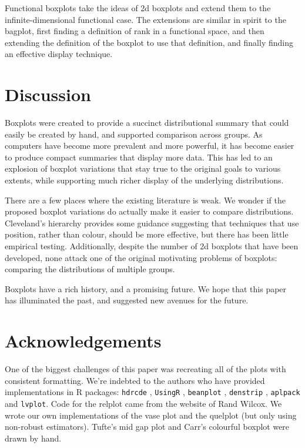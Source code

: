 \documentclass[oneside]{article}
\begin{document}
Functional boxplots \citep{hyndman:2010,sun:2011} take the ideas of 2d boxplots and extend them to the infinite-dimensional functional case. The extensions are similar in spirit to the bagplot, first finding a definition of rank in a functional space, and then extending the definition of the boxplot to use that definition, and finally finding an effective display technique.

\section{Discussion}
\label{sec:discussion}

Boxplots were created to provide a succinct distributional summary that could easily be created by hand, and supported comparison across groups. As computers have become more prevalent and more powerful, it has become easier  to produce compact summaries that display more data. This has led to an explosion of boxplot variations that stay true to the original goals to various extents, while supporting much richer display of the underlying distributions.

There are a few places where the existing literature is weak. We wonder if the proposed boxplot variations do actually make it easier to compare distributions. Cleveland's hierarchy \citep{cleveland:1984} provides some guidance suggesting that techniques that use position, rather than colour, should be more effective, but there has been little empirical testing. Additionally, despite the number of 2d boxplots that have been developed, none attack one of the original motivating problems of boxplots: comparing the distributions of multiple groups.

Boxplots have a rich history, and a promising future. We hope that this paper has illuminated the past, and suggested new avenues for the future.

\section{Acknowledgements}
\label{sec:acknowledgements}

One of the biggest challenges of this paper was recreating all of the plots with consistent formatting. We're indebted to the authors who have provided implementations in R packages: {\tt hdrcde} \citep{hdrcde}, {\tt UsingR} \citep{UsingR}, {\tt beanplot} \citep{kampstra:2008}, {\tt denstrip} \citep{jackson:2008}, {\tt aplpack} \citep{aplpack} and {\tt lvplot}. Code for the relplot came from the website of Rand Wilcox. We wrote our own implementations of the vase plot and the quelplot (but only using non-robust estimators). Tufte's mid gap plot and Carr's colourful boxplot were drawn by hand.


\end{document}
